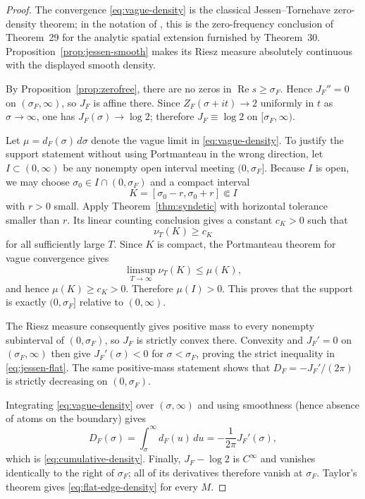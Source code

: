 \documentclass[11pt]{article}
\theoremstyle{remark}
\newcommand{\ZF}{Z_F}
\newcommand{\Ree}{\operatorname{Re}}
\newcommand{\JF}{J_F}
\begin{document}
\begin{proof}
The convergence \eqref{eq:vague-density} is the classical Jessen--Tornehave zero-density theorem; in the notation of \cite{JessenTornehave1945}, this is the zero-frequency conclusion of Theorem~29 for the analytic spatial extension furnished by Theorem~30.  Proposition~\ref{prop:jessen-smooth} makes its Riesz measure absolutely continuous with the displayed smooth density.

By Proposition~\ref{prop:zerofree}, there are no zeros in $\Ree s\ge\sigma_F$.  Hence $\JF''=0$ on $(\sigma_F,\infty)$, so $\JF$ is affine there.  Since $\ZF(\sigma+it)\to2$ uniformly in $t$ as $\sigma\to\infty$, one has $\JF(\sigma)\to\log2$; therefore $\JF\equiv\log2$ on $[\sigma_F,\infty)$.

Let $\mu=d_F(\sigma)\,d\sigma$ denote the vague limit in \eqref{eq:vague-density}.  To justify the support statement without using Portmanteau in the wrong direction, let $I\subset(0,\infty)$ be any nonempty open interval meeting $(0,\sigma_F]$.  Because $I$ is open, we may choose $\sigma_0\in I\cap(0,\sigma_F)$ and a compact interval
\[
K=[\sigma_0-r,\sigma_0+r]\Subset I
\]
with $r>0$ small.  Apply Theorem~\ref{thm:syndetic} with horizontal tolerance smaller than $r$.  Its linear counting conclusion gives a constant $c_K>0$ such that
\[
\nu_T(K)\ge c_K
\]
for all sufficiently large $T$.  Since $K$ is compact, the Portmanteau theorem for vague convergence gives
\[
\limsup_{T\to\infty}\nu_T(K)\le\mu(K),
\]
and hence $\mu(K)\ge c_K>0$.  Therefore $\mu(I)>0$.  This proves that the support is exactly $(0,\sigma_F]$ relative to $(0,\infty)$.

The Riesz measure consequently gives positive mass to every nonempty subinterval of $(0,\sigma_F)$, so $\JF$ is strictly convex there.  Convexity and $\JF'=0$ on $(\sigma_F,\infty)$ then give $\JF'(\sigma)<0$ for $\sigma<\sigma_F$, proving the strict inequality in \eqref{eq:jessen-flat}.  The same positive-mass statement shows that $D_F=-\JF'/(2\pi)$ is strictly decreasing on $(0,\sigma_F)$.

Integrating \eqref{eq:vague-density} over $(\sigma,\infty)$ and using smoothness (hence absence of atoms on the boundary) gives
\[
D_F(\sigma)=\int_\sigma^\infty d_F(u)\,du
=-\frac1{2\pi}\JF'(\sigma),
\]
which is \eqref{eq:cumulative-density}.  Finally, $\JF-\log2$ is $C^\infty$ and vanishes identically to the right of $\sigma_F$; all of its derivatives therefore vanish at $\sigma_F$.  Taylor's theorem gives \eqref{eq:flat-edge-density} for every $M$.
\end{proof}
\end{document}
